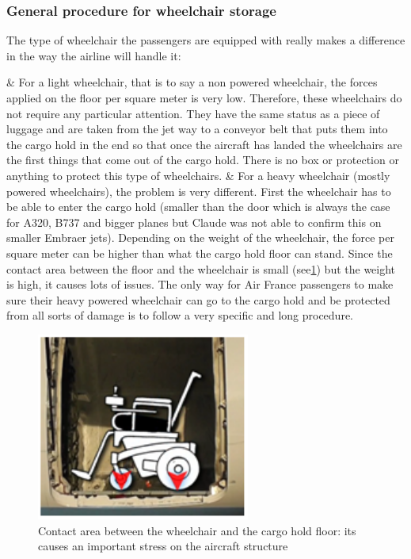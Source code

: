 \subsubsection*{General procedure for wheelchair storage}
The type of wheelchair the passengers are equipped with really makes a difference in the way the airline will handle it:
\begin{easylist}[itemize]
& For a light wheelchair, that is to say a non powered wheelchair, the forces applied on the floor per square meter is very low. Therefore, these wheelchairs do not require any particular attention. They have the same status as a piece of luggage and are taken from the jet way to a conveyor belt that puts them into the cargo hold in the end so that once the aircraft has landed the wheelchairs are the first things that come out of the cargo hold. There is no box or protection or anything to protect this type of wheelchairs.
& For a heavy wheelchair (mostly powered wheelchairs), the problem is very different. First the wheelchair has to be able to enter the cargo hold (smaller than the door which is always the case for A320, B737 and bigger planes but Claude was not able to confirm this on smaller Embraer jets). Depending on the weight of the wheelchair, the force per square meter can be higher than what the cargo hold floor can stand. Since the contact area between the floor and the wheelchair is small (see\ref{fig:wheelchair_contact_area}) but the weight is high, it causes lots of issues. The only way for Air France passengers to make sure their heavy powered wheelchair can go to the cargo hold and be protected from all sorts of damage is to follow a very specific and long procedure.
\end{easylist}
\begin{figure}[h]
\centering
\includegraphics[width=7cm]{images/wheelchair_contact_area}
\caption{Contact area between the wheelchair and the cargo hold floor: its causes an important stress on the aircraft structure}
\label{fig:wheelchair_contact_area}
\end{figure}


